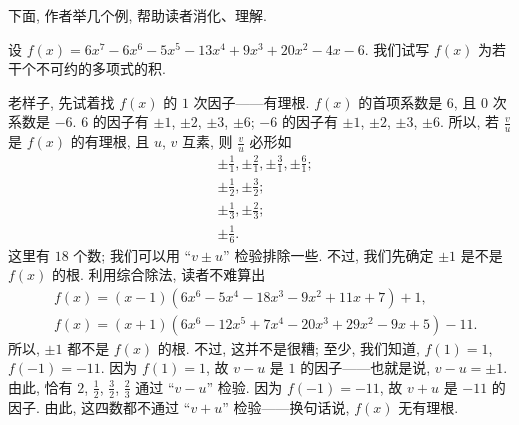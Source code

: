 下面, 作者举几个例, 帮助读者消化、理解.

\begin{example}
    设 $f(x) = 6 x^7-6 x^6-5 x^5-13 x^4+9 x^3+20 x^2-4 x-6$. 我们试写 $f(x)$ 为若干个不可约的多项式的积.

    老样子, 先试着找 $f(x)$ 的 $1$ 次因子——有理根. $f(x)$ 的首项系数是 $6$, 且 $0$ 次系数是 $-6$. $6$ 的因子有 $\pm 1$, $\pm 2$, $\pm 3$, $\pm 6$; $-6$ 的因子有 $\pm 1$, $\pm 2$, $\pm 3$, $\pm 6$. 所以, 若 $\frac{v}{u}$ 是 $f(x)$ 的有理根, 且 $u$, $v$ 互素, 则 $\frac{v}{u}$ 必形如
    \begin{align*}
         & {\pm \frac{1}{1}}, {\pm \frac{2}{1}}, {\pm \frac{3}{1}}, {\pm \frac{6}{1}}; \\
         & {\pm \frac{1}{2}}, {\pm \frac{3}{2}};                                       \\
         & {\pm \frac{1}{3}}, {\pm \frac{2}{3}};                                       \\
         & {\pm \frac{1}{6}}.
    \end{align*}
    这里有 $18$ 个数; 我们可以用 ``$v \pm u$'' 检验排除一些. 不过, 我们先确定 $\pm 1$ 是不是 $f(x)$ 的根. 利用综合除法, 读者不难算出
    \begin{align*}
         & f(x) = (x-1) (6 x^6-5 x^4-18 x^3-9 x^2+11 x+7) + 1,         \\
         & f(x) = (x+1) (6 x^6-12 x^5+7 x^4-20 x^3+29 x^2-9 x+5) - 11.
    \end{align*}
    所以, $\pm 1$ 都不是 $f(x)$ 的根. 不过, 这并不是很糟; 至少, 我们知道, $f(1) = 1$, $f(-1) = -11$. 因为 $f(1) = 1$, 故 $v - u$ 是 $1$ 的因子——也就是说, $v - u = \pm 1$. 由此, 恰有 $2$, $\frac{1}{2}$, $\frac{3}{2}$, $\frac{2}{3}$ 通过 ``$v - u$'' 检验. 因为 $f(-1) = -11$, 故 $v + u$ 是 $-11$ 的因子. 由此, 这四数都不通过 ``$v + u$'' 检验——换句话说, $f(x)$ 无有理根.


\end{example}
